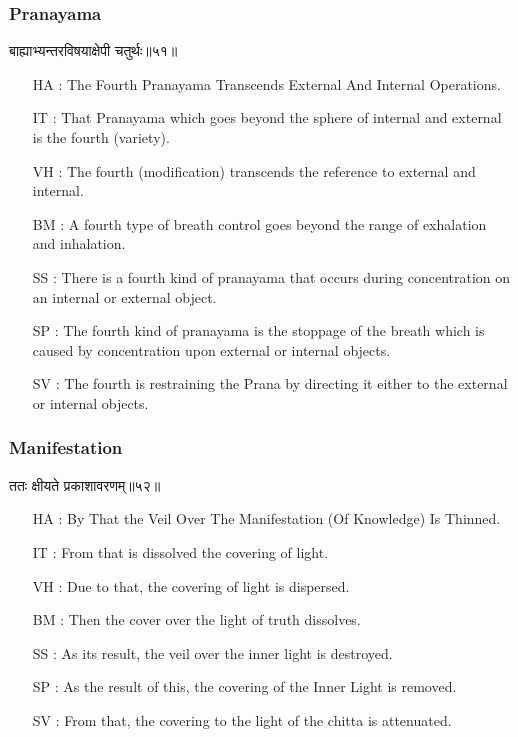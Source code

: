 \begin{frame}[fragile]\frametitle{Pranayama}
\begin{sanskrit}
बाह्याभ्यन्तरविषयाक्षेपी चतुर्थः॥५१॥
\end{sanskrit}

	\begin{itemize}
	\item [HA]: The Fourth Pranayama Transcends External And Internal Operations.
	\item [IT]: That Pranayama which goes beyond the sphere of internal and external is the fourth (variety).
	\item [VH]: The fourth (modification) transcends the reference to external and internal.
	\item [BM]: A fourth type of breath control goes beyond the range of exhalation and inhalation.
	\item [SS]: There is a fourth kind of pranayama that occurs during concentration on an internal or external object.
	\item [SP]: The fourth kind of pranayama is the stoppage of the breath which is caused by concentration upon external or internal objects.
	\item [SV]: The fourth is restraining the Prana by directing it either to the external or internal objects. 
	\end{itemize}
\end{frame}

\begin{frame}[fragile]\frametitle{Manifestation}
\begin{sanskrit}
ततः क्षीयते प्रकाशावरणम्॥५२॥
\end{sanskrit}

	\begin{itemize}
	\item [HA]: By That the Veil Over The Manifestation (Of Knowledge) Is Thinned.
	\item [IT]: From that is dissolved the covering of light.
	\item [VH]: Due to that, the covering of light is dispersed.
	\item [BM]: Then the cover over the light of truth dissolves.
	\item [SS]: As its result, the veil over the inner light is destroyed.
	\item [SP]: As the result of this, the covering of the Inner Light is removed.
	\item [SV]: From that, the covering to the light of the chitta is attenuated. 
	\end{itemize}
\end{frame}

